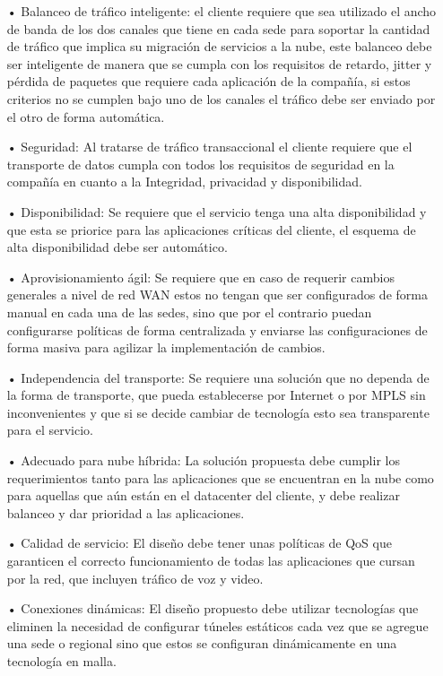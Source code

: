 \begin{itemize}
\item[•]Balanceo de tráfico inteligente: el cliente requiere que sea utilizado el ancho de banda de los dos canales que tiene en cada sede para soportar la cantidad de tráfico que implica su migración de servicios a la nube, este balanceo debe ser inteligente de manera que se cumpla con los requisitos de retardo, jitter y pérdida de paquetes que requiere cada aplicación de la compañía, si estos criterios no se cumplen bajo uno de los canales el tráfico debe ser enviado por el otro de forma automática.

\item[•]Seguridad: Al tratarse de tráfico transaccional el cliente requiere que el transporte de datos cumpla con todos los requisitos de seguridad en la compañía en cuanto a la Integridad, privacidad y disponibilidad.

\item[•]Disponibilidad: Se requiere que el servicio tenga una alta disponibilidad y que esta se priorice para las aplicaciones críticas del cliente, el esquema de alta disponibilidad debe ser automático.

\item[•]Aprovisionamiento ágil: Se requiere que en caso de requerir cambios generales a nivel de red WAN estos no tengan que ser configurados de forma manual en cada una de las sedes, sino que por el contrario puedan configurarse políticas de forma centralizada y enviarse las configuraciones de forma masiva para agilizar la implementación de cambios.

\item[•]Independencia del transporte: Se requiere una solución que no dependa de la forma de transporte, que pueda establecerse por Internet o por MPLS sin inconvenientes y que si se decide cambiar de tecnología esto sea transparente para el servicio.

\item[•]Adecuado para nube híbrida: La solución propuesta debe cumplir los requerimientos tanto para las aplicaciones que se encuentran en la nube como para aquellas que aún están en el datacenter del cliente, y debe realizar balanceo y dar prioridad a las aplicaciones.

\item[•]Calidad de servicio: El diseño debe tener unas políticas de QoS que garanticen el correcto funcionamiento de todas las aplicaciones que cursan por la red, que incluyen tráfico de voz y video.                                 

\item[•]Conexiones dinámicas: El diseño propuesto debe utilizar tecnologías que eliminen la necesidad de configurar túneles estáticos cada vez que se agregue una sede o regional sino que estos se configuran dinámicamente en una tecnología en malla.
\end{itemize}

